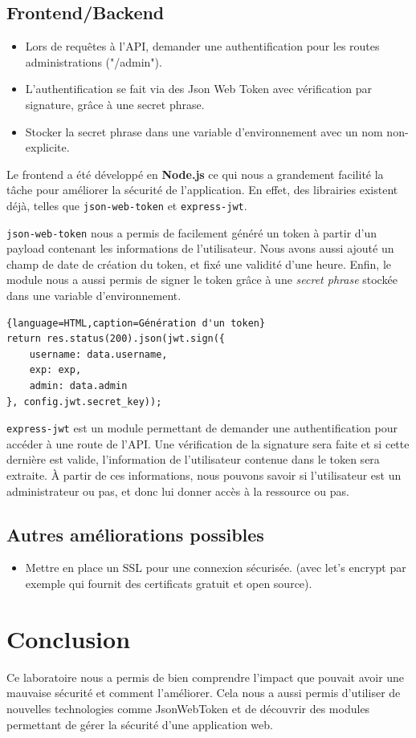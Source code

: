 \documentclass[a4paper]{article}
\begin{document}
\subsection{Frontend/Backend}
\begin{itemize}
\item Lors de requêtes à l'API, demander une authentification pour les routes administrations ("/admin").
\item L'authentification se fait via des Json Web Token avec vérification par signature, grâce à une secret phrase.
\item Stocker la secret phrase dans une variable d'environnement avec un nom non-explicite.
\end{itemize}

Le frontend a été développé en \textbf{Node.js} ce qui nous a grandement facilité la tâche pour améliorer la sécurité de l'application. En effet, des librairies existent déjà, telles que \texttt{json-web-token} et \texttt{express-jwt}.

\texttt{json-web-token} nous a permis de facilement généré un token à partir d'un payload contenant les informations de l'utilisateur. Nous avons aussi ajouté un champ de date de création du token, et fixé une validité d'une heure. Enfin, le module nous a aussi permis de signer le token grâce à une \textit{secret phrase} stockée dans une variable d'environnement.

\begin{lstlisting}{language=HTML,caption=Génération d'un token}
return res.status(200).json(jwt.sign({
	username: data.username,
	exp: exp,
	admin: data.admin
}, config.jwt.secret_key));
\end{lstlisting}

\texttt{express-jwt} est un module permettant de demander une authentification pour accéder à une route de l'API. Une vérification de la signature sera faite et si cette dernière est valide, l'information de l'utilisateur contenue dans le token sera extraite. À partir de ces informations, nous pouvons savoir si l'utilisateur est un administrateur ou pas, et donc lui donner accès à la ressource ou pas.

\subsection{Autres améliorations possibles}
\begin{itemize}
\item Mettre en place un SSL pour une connexion sécurisée. (avec let's encrypt par exemple qui fournit des certificats gratuit et open source).
\end{itemize}

\section{Conclusion}

Ce laboratoire nous a permis de bien comprendre l'impact que pouvait avoir une mauvaise sécurité et comment l'améliorer. Cela nous a aussi permis d'utiliser de nouvelles technologies comme JsonWebToken et de découvrir des modules permettant de gérer la sécurité d'une application web.
\end{document}
